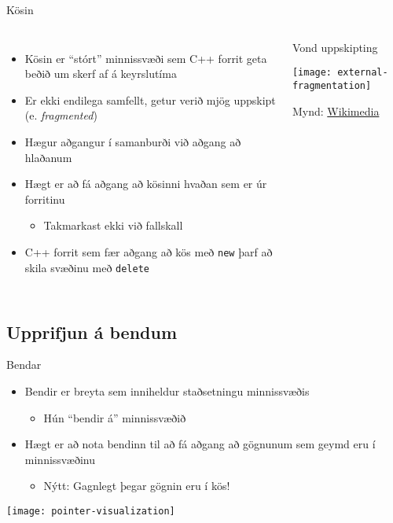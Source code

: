 \documentclass[handout]{beamer}
\begin{document}
\begin{frame}{Kösin}
\begin{columns}
\begin{itemize}
 \item Kösin er ``stórt'' minnissvæði sem C++ forrit geta beðið um skerf af á keyrslutíma
 \item Er ekki endilega samfellt, getur verið mjög uppskipt (e. \emph{fragmented})
 \item Hægur aðgangur í samanburði við aðgang að hlaðanum
 \item Hægt er að fá aðgang að kösinni hvaðan sem er úr forritinu
 \begin{itemize}
  \item Takmarkast ekki við fallskall
 \end{itemize}
 \item C++ forrit sem fær aðgang að kös með \texttt{new} þarf að skila svæðinu með \texttt{delete}
\end{itemize}
\begin{center}
Vond uppskipting

\texttt{[image: external-fragmentation]}

{\tiny Mynd: \href{https://commons.wikimedia.org/wiki/File:External_Fragmentation.svg}{Wikimedia}}
\end{center}
\end{columns}
\end{frame}

\subsection{Upprifjun á bendum}

\begin{frame}{Bendar}
\begin{itemize}
 \item Bendir er breyta sem inniheldur staðsetningu minnissvæðis
 \begin{itemize}
  \item Hún ``bendir á'' minnissvæðið
 \end{itemize}
 \item Hægt er að nota bendinn til að fá aðgang að gögnunum sem geymd eru í minnissvæðinu
 \begin{itemize}
  \item {\color{red} Nýtt}: Gagnlegt þegar gögnin eru í kös!
 \end{itemize}
\end{itemize}
\begin{center}
\texttt{[image: pointer-visualization]}
\end{center}
\end{frame}
\end{document}
